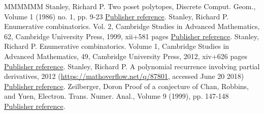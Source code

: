 \documentclass[11pt]{article}
\theoremstyle{definition}
\numberwithin{equation}{section}
\numberwithin{figure}{section}
\numberwithin{table}{section}
\begin{document}
\begin{thebibliography}{MMMMMM}
 Stanley, Richard P. Two poset polytopes, Discrete Comput. Geom., Volume 1 (1986) no. 1, pp. 9-23 \href{https://ahl.centre-mersenne.org/item/AHL_2020__3__275_0/#S86}{Publisher reference}.
 Stanley, Richard P. Enumerative combinatorics. Vol. 2, Cambridge Studies in Advanced Mathematics, 62, Cambridge University Press, 1999, xii+581 pages \href{https://ahl.centre-mersenne.org/item/AHL_2020__3__275_0/#stanley-ec2}{Publisher reference}.
 Stanley, Richard P. Enumerative combinatorics. Volume 1, Cambridge Studies in Advanced Mathematics, 49, Cambridge University Press, 2012, xiv+626 pages \href{https://ahl.centre-mersenne.org/item/AHL_2020__3__275_0/#S12}{Publisher reference}.
 Stanley, Richard P. A polynomial recurrence involving partial derivatives, 2012 (\url{https://mathoverflow.net/q/87801,} accessed June 20 2018) \href{https://ahl.centre-mersenne.org/item/AHL_2020__3__275_0/#stanley-2012}{Publisher reference}.
 Zeilberger, Doron Proof of a conjecture of Chan, Robbins, and Yuen, Electron. Trans. Numer. Anal., Volume 9 (1999), pp. 147-148 \href{https://ahl.centre-mersenne.org/item/AHL_2020__3__275_0/#Z99}{Publisher reference}.
\end{thebibliography}
\end{document}
